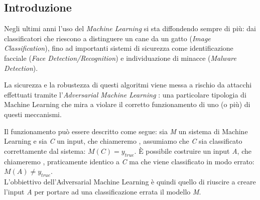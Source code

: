 \subsection{Introduzione}

Negli ultimi anni l'uso del \textit{Machine Learning} si sta diffondendo sempre di più: dai classificatori che riescono a distinguere un cane da un gatto (\textit{Image Classification}), fino ad importanti sistemi di sicurezza come identificazione facciale (\textit{Face Detection/Recognition}) e individuazione di minacce (\textit{Malware Detection}).\par

La sicurezza e la robustezza di questi algoritmi viene messa a rischio da attacchi effettuati tramite l'\textit{Adversarial Machine Learning} \cite{adversarial}: una particolare tipologia di Machine Learning che mira a violare il corretto funzionamento di uno (o più) di questi meccanismi.

Il funzionamento può essere descritto come segue: sia \textit{M} un sistema di Machine Learning e sia \textit{C} un input, che chiameremo , assumiamo che \textit{C} sia classificato correttamente dal sistema: \(M(C) = y_{true}\). È possibile costruire un input \textit{A}, che chiameremo , praticamente identico a \textit{C} ma che viene classificato in modo errato: \(M(A) \neq y_{true}\).\\
L'obbiettivo dell'Adversarial Machine Learning è quindi quello di riuscire a creare l'input \textit{A} per portare ad una classificazione errata il modello \textit{M}.
